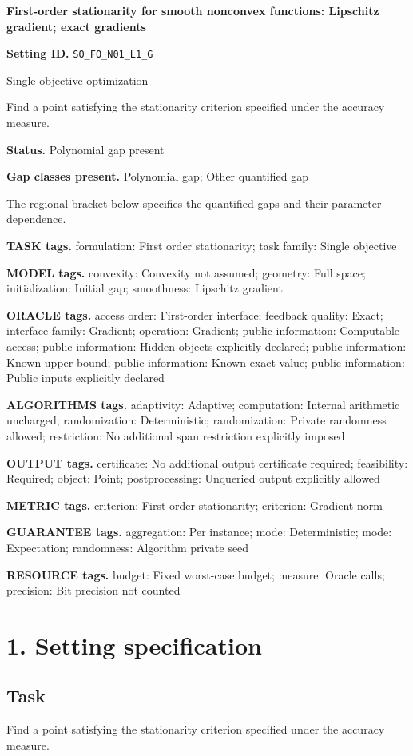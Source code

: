 \documentclass[10pt,a4paper]{article}
\begin{document}
\raggedright

{\LARGE\bfseries\sffamily\color{AtlasNavy} First-order stationarity for smooth nonconvex functions: Lipschitz gradient; exact gradients\par}\vspace{5pt}
\textbf{Setting ID.} \texttt{SO\_\allowbreak{}FO\_\allowbreak{}N01\_\allowbreak{}L1\_\allowbreak{}G}

Single-objective optimization

Find a point satisfying the stationarity criterion specified under the accuracy measure.

\textbf{Status.} Polynomial gap present

\textbf{Gap classes present.} Polynomial gap; Other quantified gap

The regional bracket below specifies the quantified gaps and their parameter dependence.

\textbf{TASK tags.} formulation: First order stationarity; task family: Single objective

\textbf{MODEL tags.} convexity: Convexity not assumed; geometry: Full space; initialization: Initial gap; smoothness: Lipschitz gradient

\textbf{ORACLE tags.} access order: First-order interface; feedback quality: Exact; interface family: Gradient; operation: Gradient; public information: Computable access; public information: Hidden objects explicitly declared; public information: Known upper bound; public information: Known exact value; public information: Public inputs explicitly declared

\textbf{ALGORITHMS tags.} adaptivity: Adaptive; computation: Internal arithmetic uncharged; randomization: Deterministic; randomization: Private randomness allowed; restriction: No additional span restriction explicitly imposed

\textbf{OUTPUT tags.} certificate: No additional output certificate required; feasibility: Required; object: Point; postprocessing: Unqueried output explicitly allowed

\textbf{METRIC tags.} criterion: First order stationarity; criterion: Gradient norm

\textbf{GUARANTEE tags.} aggregation: Per instance; mode: Deterministic; mode: Expectation; randomness: Algorithm private seed

\textbf{RESOURCE tags.} budget: Fixed worst-case budget; measure: Oracle calls; precision: Bit precision not counted

\section{1. Setting specification}
\subsection{Task}
Find a point satisfying the stationarity criterion specified under the accuracy measure.
\end{document}
